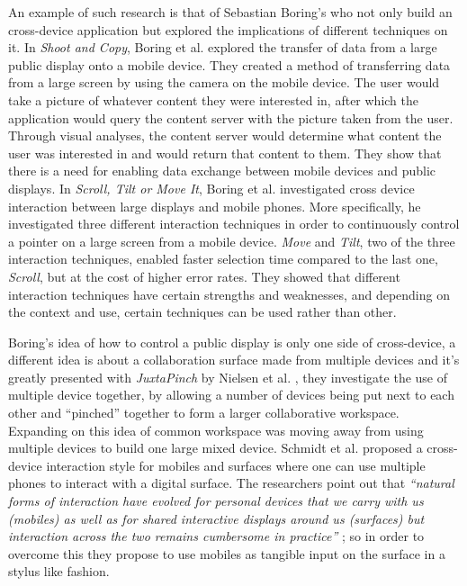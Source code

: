 An example of such research is that of Sebastian Boring's who not only build an cross-device application but explored the implications of different techniques on it. In \emph{Shoot and Copy}, Boring et al. \cite{Boring:2007} explored the transfer of data from a large public display onto a mobile device.
They created a method of transferring data from a large screen by using the camera on the mobile device.
The user would take a picture of whatever content they were interested in, after which the application would query the content server with the picture taken from the user.
Through visual analyses, the content server would determine what content the user was interested in and would return that content to them.
They show that there is a need for enabling data exchange between mobile devices and public displays.
In \emph{Scroll, Tilt or Move It}, Boring et al. \cite{Boring:2009} investigated cross device interaction between large displays and mobile phones.
More specifically, he investigated three different interaction techniques in order to continuously control a pointer on a large screen from a mobile device.
\emph{Move} and \emph{Tilt}, two of the three interaction techniques, enabled faster selection time compared to the last one, \emph{Scroll}, but at the cost of higher error rates.
They showed that different interaction techniques have certain strengths and weaknesses, and depending on the context and use, certain techniques can be used rather than other. 

Boring's idea of how to control a public display is only one side of cross-device, a different idea is about a collaboration surface made from multiple devices and it's greatly presented with
\emph{JuxtaPinch} by Nielsen et al. \cite{Nielsen:2014}, they investigate the  use of multiple device together, by allowing a number of devices being put next to each other and ``pinched'' together to form a larger collaborative workspace.
Expanding on this idea of common workspace was moving away from using multiple devices to build one large mixed device. Schmidt et al. proposed a cross-device interaction style for mobiles and surfaces where one can use multiple phones to interact with a digital surface.
The researchers point out that \emph{``natural forms of interaction have evolved for personal devices that we carry with us (mobiles) as well as for shared interactive displays around us (surfaces) but interaction across the two remains cumbersome in practice''} \cite{Schmidt:2012}; so in order to overcome this they propose to use mobiles as tangible input on the surface in a stylus like fashion.

